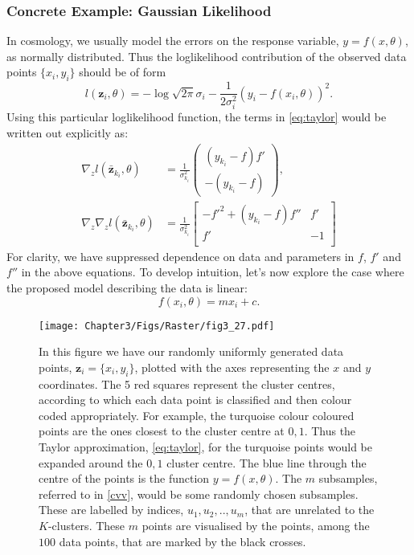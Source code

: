 \subsubsection{Concrete Example: Gaussian Likelihood}

In cosmology, we usually model the errors on the response variable, $y= f(x,\theta)$, as normally distributed. Thus the loglikelihood contribution of the observed data points $\{x_i,y_i \}$ should be of form
%
\begin{equation}
   l (\textbf{z}_{i},\theta) = - \log \sqrt{2\pi} \sigma_i -\frac{1}{2\sigma_i^2}(y_i-f(x_i, \theta))^2.
\end{equation}
%
Using this particular loglikelihood function, the terms in \cref{eq:taylor} would be written out explicitly as:
%
\begin{align}
   \nabla_z l(\bar{\textbf{z}}_{k_{i}},\theta) &= \frac{1}{\sigma_{k_{i}}^2} \begin{pmatrix}(y_{k_{i}}-f)f'\\-(y_{k_{i}}-f)\end{pmatrix},\\
   \nabla_z \nabla_z l(\bar{\textbf{z}}_{k_{i}},\theta) &=  \frac{1}{\sigma_{k_{i}}^2} \begin{bmatrix}
-f'^2+(y_{k_{i}}-f)f'' & f' \\
f' & -1 \\
\end{bmatrix}
\end{align}
%
For clarity, we have suppressed dependence on data and parameters in $f$, $f'$ and $f''$ in the above equations. To develop intuition, let's now explore the case where the proposed model describing the data is linear:
\begin{equation}
    f(x_i,\theta) = mx_i+ c.
\label{eq:strt}
\end{equation}
\begin{figure} 
\centering    
\texttt{[image: Chapter3/Figs/Raster/fig3\_27.pdf]}
\caption{In this figure we have our randomly uniformly generated data points, $\textbf{z}_i= \{x_i,y_i \}$, plotted with the axes representing the $x$ and $y$ coordinates. The 5 red squares represent the cluster centres, according to which each data point is classified and then colour coded appropriately. For example, the turquoise colour coloured points are the ones closest to the cluster centre at ${0,1}$. Thus the Taylor approximation, \cref{eq:taylor}, for the turquoise points would be expanded around the ${0,1}$ cluster centre. The blue line through the centre of the points is the function $y=f(x,\theta)$. The $m$ subsamples, referred to in \cref{cvv}, would be some randomly chosen subsamples. These are labelled by indices, ${u_1,u_2,..,u_m}$, that are unrelated to the $K$-clusters. These $m$ points are visualised by the points, among the $100$ data points, that are marked by the black crosses.}
\label{fig:one}
\end{figure}
